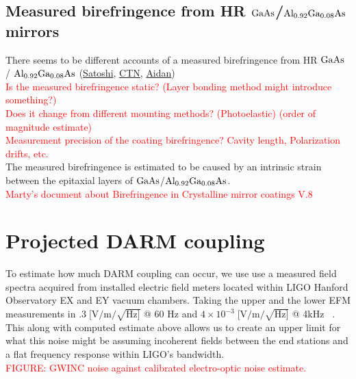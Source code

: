 

\subsection{Measured birefringence from HR $\mathrm{GaAs}$/$\mathrm{Al_{0.92}Ga_{0.08}As}$ mirrors}
There seems to be different accounts of a measured birefringence from HR $\mathrm{GaAs}$ / $\mathrm{Al_{0.92}Ga_{0.08}As}$ (\href{https://dcc.ligo.org/DocDB/0181/G2200386/001/G2200386.pdf}{Satoshi}, \href{https://nodus.ligo.caltech.edu:8081/CTN/1474}{CTN}, \href{https://dcc.ligo.org/DocDB/0181/G2200559/001/G2200559-v1%20-%20polarization.pdf}{Aidan})
\\
\textcolor{red}{Is the measured birefringence static? (Layer bonding method might introduce something?)}
\\
\textcolor{red}{Does it change from different mounting methods? (Photoelastic) (order of magnitude estimate)}
\\
\textcolor{red}{Measurement precision of the coating birefringence? Cavity length, Polarization drifts, etc.}
\\
The measured birefringence is estimated to be caused by an intrinsic strain between the epitaxial layers of $\mathrm{GaAs}$/$\mathrm{Al_{0.92}Ga_{0.08}As}$. \cite{Cole:2013}
\\
\textcolor{red}{Marty's document about Birefringence in Crystalline mirror coatings V.8}

\section{Projected DARM coupling}
To estimate how much DARM coupling can occur, we use use a measured field spectra acquired from installed electric field meters located within LIGO Hanford Observatory EX and EY vacuum chambers. Taking the upper and the lower EFM measurements in $.3\; [\mathrm{V}/\mathrm{m}/\sqrt{\mathrm{Hz}]}$ @ 60 Hz and $4\times10^{-3}\; [\mathrm{V}/\mathrm{m}/\sqrt{\mathrm{Hz}]}$ @ 4kHz ~\cite{efm_log}.
This along with computed estimate above allows us to create an upper limit for what this noise might be assuming incoherent fields between the end stations and a flat frequency response within LIGO's bandwidth.
\\
\textcolor{red}{FIGURE: GWINC noise against calibrated electro-optic noise estimate.}

